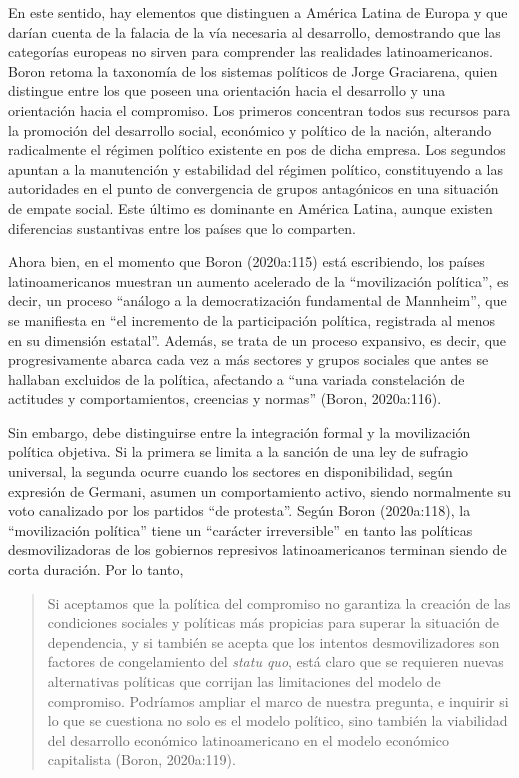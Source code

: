 En este sentido, hay elementos que distinguen a América Latina de Europa y que darían cuenta de la falacia de la vía necesaria al desarrollo, demostrando que las categorías europeas no sirven para comprender las realidades latinoamericanos. Boron retoma la taxonomía de los sistemas políticos de Jorge Graciarena, quien distingue entre los que poseen una orientación hacia el desarrollo y una orientación hacia el compromiso. Los primeros concentran todos sus recursos para la promoción del desarrollo social, económico y político de la nación, alterando radicalmente el régimen político existente en pos de dicha empresa. Los segundos apuntan a la manutención y estabilidad del régimen político, constituyendo a las autoridades en el punto de convergencia de grupos antagónicos en una situación de empate social. Este último es dominante en América Latina, aunque existen diferencias sustantivas entre los países que lo comparten.

Ahora bien, en el momento que Boron (2020a:115) está escribiendo, los países latinoamericanos muestran un aumento acelerado de la \enquote{movilización política}, es decir, un proceso \enquote{análogo a la democratización fundamental de Mannheim}, que se manifiesta en \enquote{el incremento de la participación política, registrada al menos en su dimensión estatal}. Además, se trata de un proceso expansivo, es decir, que progresivamente abarca cada vez a más sectores y grupos sociales que antes se hallaban excluidos de la política, afectando a \enquote{una variada constelación de actitudes y comportamientos, creencias y normas} (Boron, 2020a:116).

Sin embargo, debe distinguirse entre la integración formal y la movilización política objetiva. Si la primera se limita a la sanción de una ley de sufragio universal, la segunda ocurre cuando los sectores en disponibilidad, según expresión de Germani, asumen un comportamiento activo, siendo normalmente su voto canalizado por los partidos \enquote{de protesta}. Según Boron (2020a:118), la \enquote{movilización política} tiene un \enquote{carácter irreversible} en tanto las políticas desmovilizadoras de los gobiernos represivos latinoamericanos terminan siendo de corta duración. Por lo tanto,

\begin{quote}
Si aceptamos que la política del compromiso no garantiza la creación de las condiciones sociales y políticas más propicias para superar la situación de dependencia, y si también se acepta que los intentos desmovilizadores son factores de congelamiento del \emph{statu quo}, está claro que se requieren nuevas alternativas políticas que corrijan las limitaciones del modelo de compromiso. Podríamos ampliar el marco de nuestra pregunta, e inquirir si lo que se cuestiona no solo es el modelo político, sino también la viabilidad del desarrollo económico latinoamericano en el modelo económico capitalista (Boron, 2020a:119).
\end{quote}

